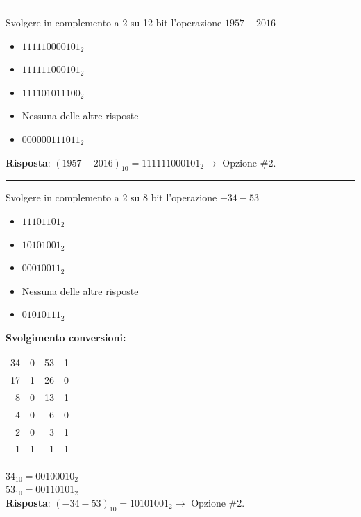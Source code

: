 \documentclass[12pt, a4paper]{article}
\begin{document}
\vspace{0.5cm}
\hrule
\vspace{0.5cm}

Svolgere in complemento a 2 su 12 bit l'operazione $1957 - 2016$
\begin{itemize}
    \item[$\square$] $111110000101_2$
    \item[$\blacksquare$] $111111000101_2$
    \item[$\square$] $111101011100_2$
    \item[$\square$] Nessuna delle altre risposte
    \item[$\square$] $000000111011_2$
\end{itemize}

\textbf{Risposta}: $(1957 - 2016)_{10} = 111111000101_2 \rightarrow$ Opzione \#2.

\vspace{0.5cm}
\hrule
\vspace{0.5cm}

Svolgere in complemento a 2 su 8 bit l'operazione $-34 - 53$
\begin{itemize}
    \item[$\square$] $11101101_2$
    \item[$\blacksquare$] $10101001_2$
    \item[$\square$] $00010011_2$
    \item[$\square$] Nessuna delle altre risposte
    \item[$\square$] $01010111_2$
\end{itemize}

\textbf{Svolgimento conversioni:}
\begin{center}
\begin{tabular}{r|c@{\hskip 1in}r|c}
34 & 0 & 53 & 1 \\
17 & 1 & 26 & 0 \\
 8 & 0 & 13 & 1 \\
 4 & 0 &  6 & 0 \\
 2 & 0 &  3 & 1 \\
 1 & 1 &  1 & 1
\end{tabular}
\end{center}
$34_{10} = 00100010_2$ \\
$53_{10} = 00110101_2$ \\
\textbf{Risposta}: $(-34 - 53)_{10} = 10101001_2 \rightarrow$ Opzione \#2.
\end{document}
